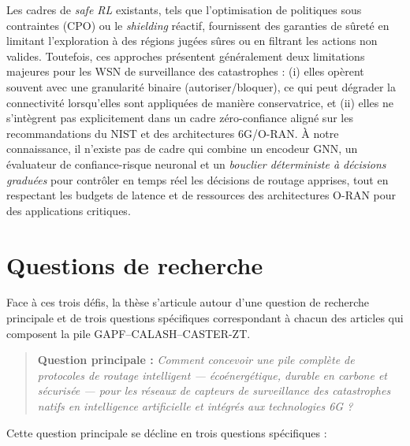 Les cadres de \emph{safe RL} existants, tels que l'optimisation de politiques sous contraintes (CPO) ou le \emph{shielding} réactif, fournissent des garanties de sûreté en limitant l'exploration à des régions jugées sûres ou en filtrant les actions non valides\cite{achiam2017cpo,alshiekh2018shielding,garcia2015saferl}. Toutefois, ces approches présentent généralement deux limitations majeures pour les WSN de surveillance des catastrophes : (i) elles opèrent souvent avec une granularité binaire (autoriser/bloquer), ce qui peut dégrader la connectivité lorsqu'elles sont appliquées de manière conservatrice, et (ii) elles ne s'intègrent pas explicitement dans un cadre zéro-confiance aligné sur les recommandations du NIST et des architectures 6G/O-RAN\cite{rose2020nist,polese2023oran,pranger2025shields,adaptive_shielding_iclr2026}. À notre connaissance, il n'existe pas de cadre qui combine un encodeur GNN, un évaluateur de confiance-risque neuronal et un \emph{bouclier déterministe à décisions graduées} pour contrôler en temps réel les décisions de routage apprises, tout en respectant les budgets de latence et de ressources des architectures O-RAN pour des applications critiques\cite{corsi2024verification,dmps_shielding2024,ztaiot_acm2025}.

\section{Questions de recherche}\label{sec:Questions}

Face à ces trois défis, la thèse s'articule autour d'une question de recherche principale et de trois questions spécifiques correspondant à chacun des articles qui composent la pile GAPF--CALASH--CASTER-ZT.

\medskip
\begin{quote}
\textbf{Question principale :} \emph{Comment concevoir une pile complète de protocoles de routage intelligent — écoénergétique, durable en carbone et sécurisée — pour les réseaux de capteurs de surveillance des catastrophes natifs en intelligence artificielle et intégrés aux technologies 6G ?}
\end{quote}

\medskip
Cette question principale se décline en trois questions spécifiques :

